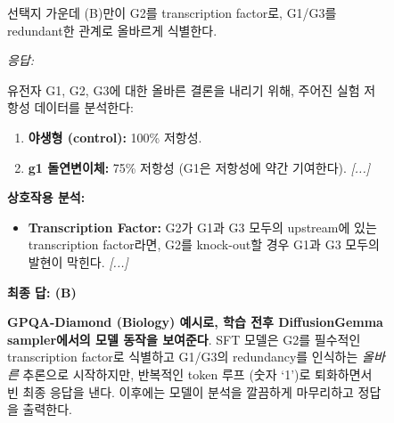 \begin{figure}[t]
\begin{minipage}[t]{0.49\textwidth}
\begin{mdframed}[style=afterbox]
\begin{mdframed}[style=thinkbox]
\noindent 선택지 가운데 (B)만이 G2를 transcription factor로, G1/G3를 redundant한 관계로 올바르게 식별한다.
\end{mdframed}
\vspace{2pt}
\noindent\textit{응답:}
\begin{mdframed}[style=thinkbox]
유전자 G1, G2, G3에 대한 올바른 결론을 내리기 위해, 주어진 실험 저항성 데이터를 분석한다:
\begin{enumerate}[leftmargin=12pt, labelsep=4pt, itemsep=0pt, parsep=0pt, topsep=2pt]
\item \textbf{야생형 (control):} 100\% 저항성.
\item \textbf{g1 돌연변이체:} 75\% 저항성 (G1은 저항성에 약간 기여한다). \textit{[...]}
\end{enumerate}

\noindent\textbf{상호작용 분석:}
\begin{itemize}[leftmargin=12pt, labelsep=4pt, itemsep=0pt, parsep=0pt, topsep=2pt]
\item \textbf{Transcription Factor:} G2가 G1과 G3 모두의 upstream에 있는 transcription factor라면, G2를 knock-out할 경우 G1과 G3 모두의 발현이 막힌다. \textit{[...]}
\end{itemize}

\vspace{2pt}
\noindent\textbf{최종 답: (B)}
\end{mdframed}
\end{mdframed}
\end{minipage}
\caption{\textbf{GPQA-Diamond (Biology) 예시로, \sdrl 학습 전후 DiffusionGemma sampler에서의 모델 동작을 보여준다}. SFT 모델은 G2를 필수적인 transcription factor로 식별하고 G1/G3의 redundancy를 인식하는 \emph{올바른} 추론으로 시작하지만, 반복적인 token 루프 (숫자 `1')로 퇴화하면서 빈 최종 응답을 낸다. \sdrl 이후에는 모델이 분석을 깔끔하게 마무리하고 정답을 출력한다.}
\label{fig:gpqa-rl-example-biology}
\end{figure}

